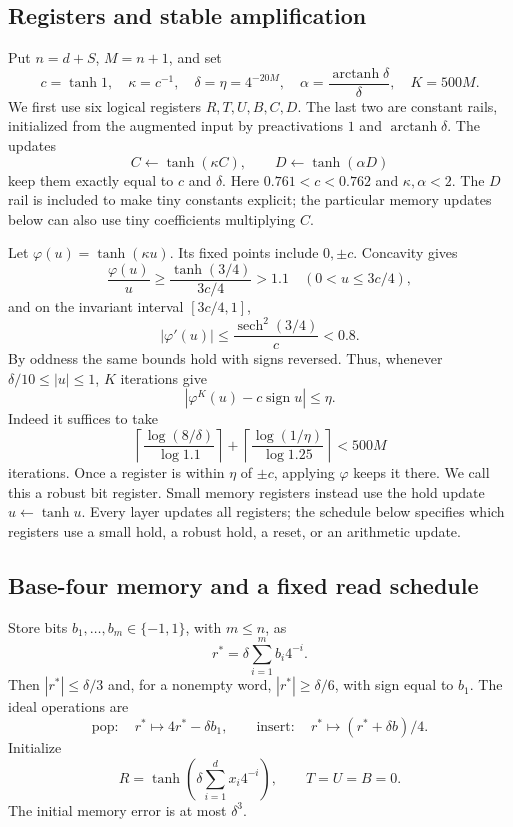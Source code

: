 \documentclass[11pt]{article}
\theoremstyle{remark}
\newcommand{\sign}{\operatorname{sign}}
\begin{document}
\subsection{Registers and stable amplification}

Put $n=d+S$, $M=n+1$, and set
\[
 c=\tanh1,\quad \kappa=c^{-1},\quad
 \delta=\eta=4^{-20M},\quad
 \alpha=\frac{\operatorname{arctanh}\delta}{\delta},\quad K=500M.
\]
We first use six logical registers $R,T,U,B,C,D$.
The last two are constant rails, initialized from the augmented input
by preactivations $1$ and $\operatorname{arctanh}\delta$.
The updates
\[
 C\leftarrow\tanh(\kappa C),\qquad
 D\leftarrow\tanh(\alpha D)
\]
keep them exactly equal to $c$ and $\delta$.
Here $0.761<c<0.762$ and $\kappa,\alpha<2$.
The $D$ rail is included to make tiny constants explicit; the particular
memory updates below can also use tiny coefficients multiplying $C$.

Let $\varphi(u)=\tanh(\kappa u)$.
Its fixed points include $0,\pm c$. Concavity gives
\[
 \frac{\varphi(u)}u\ge
 \frac{\tanh(3/4)}{3c/4}>1.1
 \quad(0<u\le3c/4),
\]
and on the invariant interval $[3c/4,1]$,
\[
 |\varphi'(u)|\le\frac{\operatorname{sech}^2(3/4)}c<0.8.
\]
By oddness the same bounds hold with signs reversed. Thus, whenever
$\delta/10\le|u|\le1$, $K$ iterations give
\[
 |\varphi^{K}(u)-c\sign u|\le\eta.
\]
Indeed it suffices to take
\[
 \left\lceil\frac{\log(8/\delta)}{\log1.1}\right\rceil+
 \left\lceil\frac{\log(1/\eta)}{\log1.25}\right\rceil<500M
\]
iterations. Once a register is within $\eta$ of $\pm c$, applying
$\varphi$ keeps it there. We call this a robust bit register.
Small memory registers instead use the hold update $u\leftarrow\tanh u$.
Every layer updates all registers; the schedule below specifies which
registers use a small hold, a robust hold, a reset, or an arithmetic update.

\subsection{Base-four memory and a fixed read schedule}

Store bits $b_1,\ldots,b_m\in\{-1,1\}$, with $m\le n$, as
\[
 r^*=\delta\sum_{i=1}^m b_i4^{-i}.
\]
Then $|r^*|\le\delta/3$ and, for a nonempty word,
$|r^*|\ge\delta/6$, with sign equal to $b_1$.
The ideal operations are
\[
 \text{pop}:\quad r^*\mapsto4r^*-\delta b_1,
 \qquad
 \text{insert}:\quad r^*\mapsto(r^*+\delta b)/4.
\]
Initialize
\[
 R=\tanh\left(\delta\sum_{i=1}^d x_i4^{-i}\right),
 \qquad T=U=B=0.
\]
The initial memory error is at most $\delta^3$.
\end{document}

